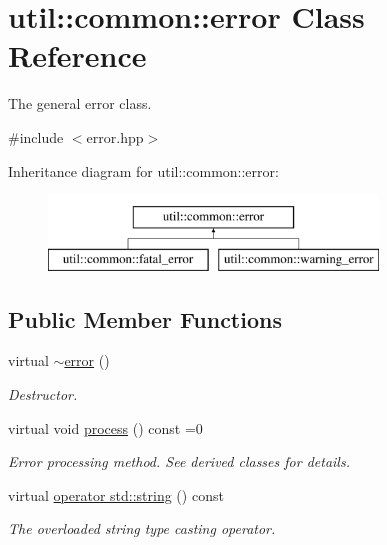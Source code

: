 \hypertarget{classutil_1_1common_1_1error}{\section{util\-:\-:common\-:\-:error \-Class \-Reference}
\label{classutil_1_1common_1_1error}
}


\-The general error class.  




{\ttfamily \#include $<$error.\-hpp$>$}

\-Inheritance diagram for util\-:\-:common\-:\-:error\-:\begin{figure}[H]
\begin{center}
\leavevmode
\includegraphics[height=2.000000cm]{classutil_1_1common_1_1error}
\end{center}
\end{figure}
\subsection*{\-Public \-Member \-Functions}
\begin{DoxyCompactItemize}
\item 
\hypertarget{classutil_1_1common_1_1error_afaacc98d128e170ab3f0164d62b939ed}{virtual \hyperlink{classutil_1_1common_1_1error_afaacc98d128e170ab3f0164d62b939ed}{$\sim$error} ()}\label{classutil_1_1common_1_1error_afaacc98d128e170ab3f0164d62b939ed}

\begin{DoxyCompactList}\small\item\em \-Destructor. \end{DoxyCompactList}\item 
\hypertarget{classutil_1_1common_1_1error_ad09c475e98c830b12386f14f8263927c}{virtual void \hyperlink{classutil_1_1common_1_1error_ad09c475e98c830b12386f14f8263927c}{process} () const =0}\label{classutil_1_1common_1_1error_ad09c475e98c830b12386f14f8263927c}

\begin{DoxyCompactList}\small\item\em \-Error processing method. \-See derived classes for details. \end{DoxyCompactList}\item 
\hypertarget{classutil_1_1common_1_1error_ad3395a0219f1a729d51e0a3319c348b3}{virtual \hyperlink{classutil_1_1common_1_1error_ad3395a0219f1a729d51e0a3319c348b3}{operator std\-::string} () const }\label{classutil_1_1common_1_1error_ad3395a0219f1a729d51e0a3319c348b3}

\begin{DoxyCompactList}\small\item\em \-The overloaded string type casting operator. \end{DoxyCompactList}\end{DoxyCompactItemize}
